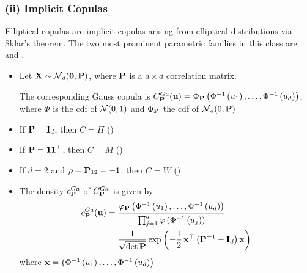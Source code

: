 \subsubsection*{(ii) Implicit Copulas}
Elliptical copulas are implicit copulas arising from elliptical distributions via Sklar's theorem. The two most prominent parametric families in this class are  and .

\begin{itemize}[leftmargin=*]
    \item Let $\operatorname{\boldsymbol{\mathbf{X}}} \sim \operatorname{\mathcal{N}}_{d}(\operatorname{\boldsymbol{\mathbf{0}}}, \boldsymbol{\mathbf{P}})$, where $\boldsymbol{\mathbf{P}}$ is a $d \times d$ correlation matrix.
    
The corresponding Gauss copula is $
C_{\boldsymbol{\mathbf{P}}}^{G a}(\operatorname{\boldsymbol{\mathbf{u}}}) =\Phi_{\boldsymbol{\mathbf{P}}}\left(\Phi^{-1}\left(u_{1}\right), \ldots, \Phi^{-1}\left(u_{d}\right)\right)$, where $\Phi$ is the cdf of $\operatorname{\mathcal{N}}(0,1)$ and $\Phi_{\boldsymbol{\mathbf{P}}}$ the cdf of $\operatorname{\mathcal{N}}_{d}(0, \boldsymbol{\mathbf{P}})$
    \item If $\boldsymbol{\mathbf{P}}=\boldsymbol{\mathbf{I}}_{d}$, then $C=\Pi$ ()
    \item If $\boldsymbol{\mathbf{P}}=\boldsymbol{\mathbf{11}}^{\operatorname{\top}}$, then $C=M$ ()
    \item If $d=2$ and $\rho=\boldsymbol{\mathbf{P}}_{12}=-1$, then $C=W$ ()
    \item The density $c_{\boldsymbol{\mathbf{P}}}^{G a}$ of $C_{\boldsymbol{\mathbf{P}}}^{G a}$ is given by
$$
\begin{aligned}
c_{\boldsymbol{\mathbf{P}}}^{G a}(\operatorname{\boldsymbol{\mathbf{u}}})&=\frac{\varphi_{\boldsymbol{\mathbf{P}}}\left(\Phi^{-1}\left(u_{1}\right), \ldots, \Phi^{-1}\left(u_{d}\right)\right)}{\prod_{j=1}^{d} \varphi\left(\Phi^{-1}\left(u_{j}\right)\right)} \\
&=\frac{1}{\sqrt{\operatorname{det} \boldsymbol{\mathbf{P}}}} \exp \left(-\frac{1}{2} \operatorname{\boldsymbol{\mathbf{x}}}^{\operatorname{\top}}\left(\boldsymbol{\mathbf{P}}^{-1}-\boldsymbol{\mathbf{I}}_{d}\right) \operatorname{\boldsymbol{\mathbf{x}}}\right)
\end{aligned}
$$
where $\operatorname{\boldsymbol{\mathbf{x}}}=\left(\Phi^{-1}\left(u_{1}\right), \ldots, \Phi^{-1}\left(u_{d}\right)\right)$
\end{itemize}








